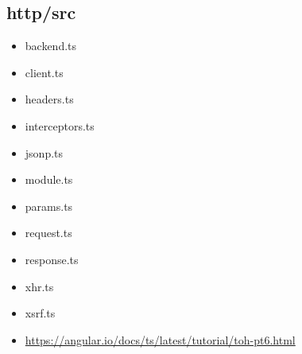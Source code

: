 \subsection{http/src}


\begin{itemize}
  \item backend.ts
  \item client.ts
  \item headers.ts
  \item interceptors.ts
  \item jsonp.ts
  \item module.ts
  \item params.ts
  \item request.ts
  \item response.ts
  \item xhr.ts
  \item xsrf.ts
\end{itemize}





\begin{itemize}
  \item \url{https://angular.io/docs/ts/latest/tutorial/toh-pt6.html}
\end{itemize}








